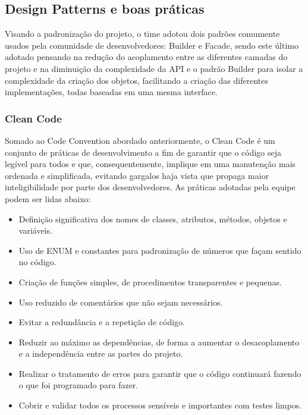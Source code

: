 \documentclass[
    12pt,               %
    openright,          %
    oneside,
    a4paper,            %
    BIBLATEX,           %
    TODO,               %
    english,            %
    brazil              %
    ]{ifsp-spo-inf-ctds}
\begin{document}
    \subsection{Design Patterns e boas práticas}
    Visando a padronização do projeto, o time adotou dois padrões comumente usados pela comunidade de desenvolvedores: Builder e Facade, sendo este último adotado pensando na redução do acoplamento entre as diferentes camadas do projeto e na diminuição da complexidade da API e o padrão Builder para isolar a complexidade da criação dos objetos, facilitando a criação das diferentes implementações, todas baseadas em uma mesma interface.

    \subsubsection{Clean Code}
    Somado ao Code Convention abordado anteriormente, o Clean Code é um conjunto de práticas de desenvolvimento a fim de garantir que o código seja legível para todos e que, consequentemente, implique em uma manutenção mais ordenada e simplificada, evitando gargalos haja vista que propaga maior inteligibilidade por parte dos desenvolvedores. As práticas adotadas pela equipe podem ser lidas abaixo:

    \begin{itemize}
        \item 
        Definição significativa dos nomes de classes, atributos, métodos, objetos e variáveis.
        \item
        Uso de ENUM e constantes para padronização de números que façam sentido no código.
        \item
        Criação de funções simples, de procedimentos transparentes e pequenas.
        \item
        Uso reduzido de comentários que não sejam necessários.
        \item
        Evitar a redundância e a repetição de código.
        \item
        Reduzir ao máximo as dependências, de forma a aumentar o desacoplamento e a independência entre as partes do projeto.
        \item
        Realizar o tratamento de erros para garantir que o código continuará fazendo o que foi programado para fazer.
        \item
        Cobrir e validar todos os processos sensíveis e importantes com testes limpos.
    \end{itemize}
\end{document}
